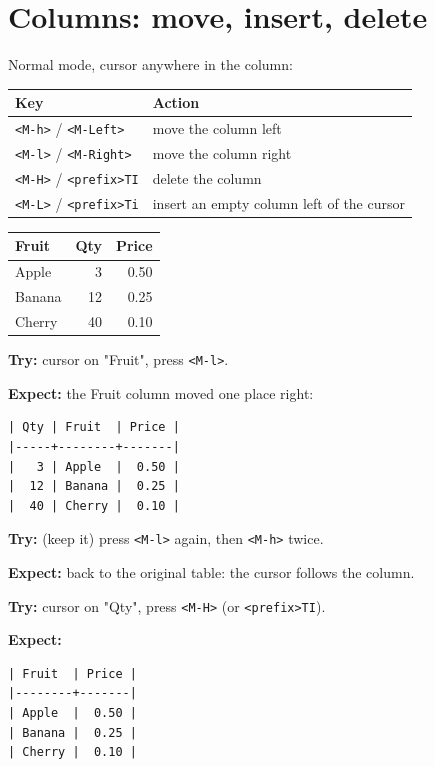 \section{Columns: move, insert, delete}
\label{sec:orgffc7ee1}
Normal mode, cursor anywhere in the column:

\begin{center}
\begin{tabular}{ll}
Key & Action\\
\hline
\texttt{<M-h>} / \texttt{<M-Left>} & move the column left\\
\texttt{<M-l>} / \texttt{<M-Right>} & move the column right\\
\texttt{<M-H>} / \texttt{<prefix>TI} & delete the column\\
\texttt{<M-L>} / \texttt{<prefix>Ti} & insert an empty column left of the cursor\\
\end{tabular}
\end{center}

\begin{table}[htbp]
\label{tab:orgd5b1c41}
\centering
\begin{tabular}{lrr}
Fruit & Qty & Price\\
\hline
Apple & 3 & 0.50\\
Banana & 12 & 0.25\\
Cherry & 40 & 0.10\\
\end{tabular}
\end{table}

\textbf{Try:} cursor on "Fruit", press \texttt{<M-l>}.

\textbf{Expect:} the Fruit column moved one place right:
\begin{verbatim}
| Qty | Fruit  | Price |
|-----+--------+-------|
|   3 | Apple  |  0.50 |
|  12 | Banana |  0.25 |
|  40 | Cherry |  0.10 |
\end{verbatim}

\textbf{Try:} (keep it) press \texttt{<M-l>} again, then \texttt{<M-h>} twice.

\textbf{Expect:} back to the original table: the cursor follows the column.

\textbf{Try:} cursor on "Qty", press \texttt{<M-H>} (or \texttt{<prefix>TI}).

\textbf{Expect:}
\begin{verbatim}
| Fruit  | Price |
|--------+-------|
| Apple  |  0.50 |
| Banana |  0.25 |
| Cherry |  0.10 |
\end{verbatim}

